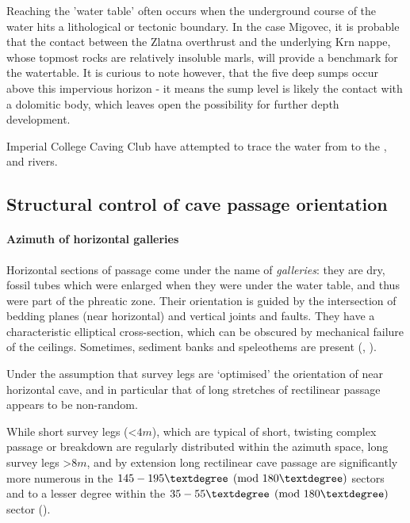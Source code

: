 Reaching the 'water table' often occurs when the underground course of the water hits a lithological or tectonic boundary. In the case Migovec, it is probable that the contact between the Zlatna overthrust and the underlying Krn nappe, whose topmost rocks are relatively insoluble marls, will provide a benchmark for the watertable. It is curious to note however, that the five deep sumps occur above this impervious horizon - it means the sump level is likely the contact with a dolomitic body, which leaves open the possibility for further depth development. 

Imperial College Caving Club have attempted to trace the water from  \citep{hm1} to the ,  and  rivers.
 
 
 \subsection{Structural control of cave passage orientation}
 \paragraph{Azimuth of horizontal galleries}
 Horizontal sections of passage come under the name of \emph{galleries}: they are dry, fossil tubes which were enlarged when they were under the water table, and thus were part of the phreatic zone. Their orientation is guided by the intersection of bedding planes (near horizontal) and vertical joints and faults. They have a characteristic elliptical cross-section, which can be obscured by mechanical failure of the ceilings. Sometimes, sediment banks and speleothems are present (, ).

Under the assumption that survey legs are `optimised'  the orientation of near horizontal cave, and in particular that of long stretches of rectilinear passage appears to be non-random. 

While short survey legs (<$4m$), which are typical of short, twisting complex passage or breakdown are regularly distributed within the azimuth space, long survey legs >$8m$, and by extension long rectilinear cave passage are significantly more numerous in the $145-195\textdegree  \pmod{180\textdegree}$  sectors and to a lesser degree within the $35-55\textdegree   \pmod{180\textdegree }$ sector ().

